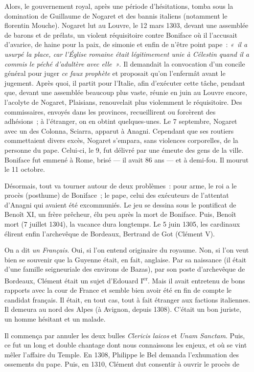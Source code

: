 \documentclass[french,twoside]{book} %
\begin{document}
Alors, le gouvernement royal, après une période d’hésitations, tomba sous la domination de Guillaume de Nogaret et des bannis italiens (notamment le florentin Mouche). Nogaret lut au Louvre, le 12 mars 1303, devant une assemblée de barons et de prélats, un violent réquisitoire contre Boniface où il l’accusait d’avarice, de haine pour la paix, de simonie et enfin de n’être point pape : \emph{« il a usurpé la place, car l’Église romaine était légitimement unie à Célestin quand il a commis le péché d’adultère avec elle »}. Il demandait la convocation d’un concile général pour juger \emph{ce faux prophète} et proposait qu’on l’enfermât avant le jugement. Après quoi, il partit pour l’Italie, afin d’exécuter cette tâche, pendant que, devant une assemblée beaucoup plus vaste, réunie en juin au Louvre encore, l’acolyte de Nogaret, Plaisians, renouvelait plus violemment le réquisitoire. Des commissaires, envoyés dans les provinces, recueillirent ou forcèrent des adhésions ; à l’étranger, on en obtint quelques-unes. Le 7 septembre, Nogaret avec un des Colonna, Sciarra, apparut à Anagni. Cependant que ses routiers commettaient divers excès, Nogaret s’empara, sans violences corporelles, de la personne du pape. Celui-ci, le 9, fut délivré par une émeute des gens de la ville. Boniface fut emmené à Rome, brisé — il avait 86 ans — et à demi-fou. Il mourut le 11 octobre.\par
Désormais, tout va tourner autour de deux problèmes : pour arme, le roi a le procès (posthume) de Boniface ; le pape, celui des exécuteurs de l’attentat d’Anagni qui avaient été excommuniés. Le jeu se dessina sous le pontificat de Benoît XI, un frère prêcheur, élu peu après la mort de Boniface. Puis, Benoît mort (7 juillet 1304), la vacance dura longtemps. Le 5 juin 1305, les cardinaux élirent enfin l’archevêque de Bordeaux, Bertrand de Got (Clément V).\par
On a dit \emph{un Français}. Oui, si l’on entend originaire du royaume. Non, si l’on veut bien se souvenir que la Guyenne était, en fait, anglaise. Par sa naissance (il était d’une famille seigneuriale des environs de Bazas), par son poste d’archevêque de Bordeaux, Clément était un sujet d’Edouard I\textsuperscript{er}. Mais il avait entretenu de bons rapports avec la cour de France et semble bien avoir été en fin de compte le candidat français. Il était, en tout cas, tout à fait étranger aux factions italiennes. Il demeura au nord des Alpes (à Avignon, depuis 1308). C’était un bon juriste, un homme hésitant et un malade.\par
Il commença par annuler les deux bulles {\itshape Clericis laicos} et {\itshape Unam Sanctam}. Puis, ce fut un long et double chantage dont nous connaissons les enjeux, et où se vint mêler l’affaire du Temple. En 1308, Philippe le Bel demanda l’exhumation des ossements du pape. Puis, en 1310, Clément dut consentir à ouvrir le procès de  
\end{document}
